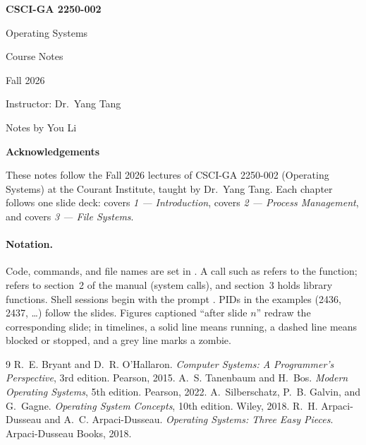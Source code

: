 \documentclass[11pt,oneside]{report}
\begin{document}
\begin{titlepage}
  \raggedright
  \vspace*{2in}
  {\Huge\bfseries CSCI-GA 2250-002\par}
  \vspace{8pt}
  {\LARGE Operating Systems\par}
  \vspace{8pt}
  {\LARGE Course Notes\par}
  \vspace{8pt}
  {\Large Fall 2026\par}
  \vspace{24pt}
  {\large Instructor: Dr.\ Yang Tang\par}
  \vspace{4pt}
  {\large Notes by You Li\par}
\end{titlepage}

\thispagestyle{fancy}
\markright{}
{\Large\bfseries Acknowledgements\par}
\vspace{6pt}
These notes follow the Fall 2026 lectures of CSCI-GA 2250-002 (Operating Systems) at the Courant Institute, taught by Dr.\ Yang Tang. Each chapter follows one slide deck:  covers \emph{1 --- Introduction},  covers \emph{2 --- Process Management}, and  covers \emph{3 --- File Systems}.

\paragraph{Notation.} Code, commands, and file names are set in . A call such as  refers to the function;  refers to section~2 of the manual (system calls), and section~3 holds library functions. Shell sessions begin with the prompt \code{\$}. PIDs in the examples (2436, 2437, \dots) follow the slides. Figures captioned ``after slide $n$'' redraw the corresponding slide; in timelines, a solid line means running, a dashed line means blocked or stopped, and a grey line marks a zombie.

\tableofcontents





\appendix


\begin{thebibliography}{9}
 R.~E. Bryant and D.~R. O'Hallaron. \emph{Computer Systems: A Programmer's Perspective}, 3rd edition. Pearson, 2015.
 A.~S. Tanenbaum and H.~Bos. \emph{Modern Operating Systems}, 5th edition. Pearson, 2022.
 A.~Silberschatz, P.~B. Galvin, and G.~Gagne. \emph{Operating System Concepts}, 10th edition. Wiley, 2018.
 R.~H. Arpaci-Dusseau and A.~C. Arpaci-Dusseau. \emph{Operating Systems: Three Easy Pieces}. Arpaci-Dusseau Books, 2018.
\end{thebibliography}
\end{document}

